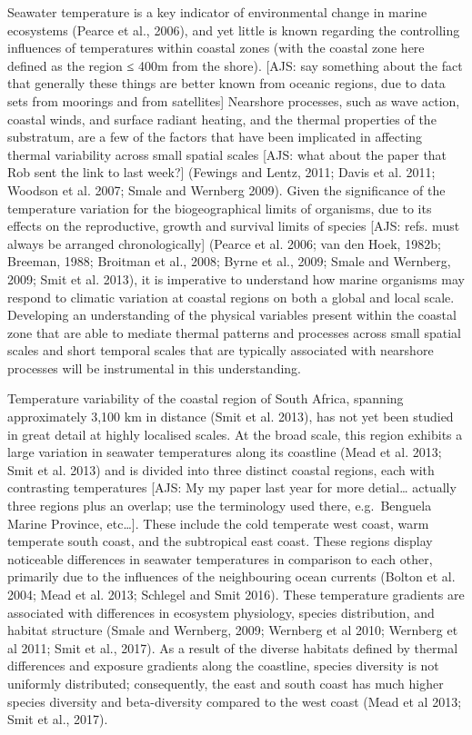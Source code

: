\documentclass[12pt,A4paper,]{article}
\begin{document}
Seawater temperature is a key indicator of environmental change in
marine ecosystems (Pearce et al., 2006), and yet little is known
regarding the controlling influences of temperatures within coastal
zones (with the coastal zone here defined as the region ≤ 400m from the
shore). {[}AJS: say something about the fact that generally these things
are better known from oceanic regions, due to data sets from moorings
and from satellites{]} Nearshore processes, such as wave action, coastal
winds, and surface radiant heating, and the thermal properties of the
substratum, are a few of the factors that have been implicated in
affecting thermal variability across small spatial scales {[}AJS: what
about the paper that Rob sent the link to last week?{]} (Fewings and
Lentz, 2011; Davis et al. 2011; Woodson et al. 2007; Smale and Wernberg
2009). Given the significance of the temperature variation for the
biogeographical limits of organisms, due to its effects on the
reproductive, growth and survival limits of species {[}AJS: refs. must
always be arranged chronologically{]} (Pearce et al. 2006; van den Hoek,
1982b; Breeman, 1988; Broitman et al., 2008; Byrne et al., 2009; Smale
and Wernberg, 2009; Smit et al. 2013), it is imperative to understand
how marine organisms may respond to climatic variation at coastal
regions on both a global and local scale. Developing an understanding of
the physical variables present within the coastal zone that are able to
mediate thermal patterns and processes across small spatial scales and
short temporal scales that are typically associated with nearshore
processes will be instrumental in this understanding.

Temperature variability of the coastal region of South Africa, spanning
approximately 3,100 km in distance (Smit et al. 2013), has not yet been
studied in great detail at highly localised scales. At the broad scale,
this region exhibits a large variation in seawater temperatures along
its coastline (Mead et al. 2013; Smit et al. 2013) and is divided into
three distinct coastal regions, each with contrasting temperatures
{[}AJS: My my paper last year for more detial\ldots{} actually three
regions plus an overlap; use the terminology used there, e.g.~Benguela
Marine Province, etc\ldots{}{]}. These include the cold temperate west
coast, warm temperate south coast, and the subtropical east coast. These
regions display noticeable differences in seawater temperatures in
comparison to each other, primarily due to the influences of the
neighbouring ocean currents (Bolton et al. 2004; Mead et al. 2013;
Schlegel and Smit 2016). These temperature gradients are associated with
differences in ecosystem physiology, species distribution, and habitat
structure (Smale and Wernberg, 2009; Wernberg et al 2010; Wernberg et al
2011; Smit et al., 2017). As a result of the diverse habitats defined by
thermal differences and exposure gradients along the coastline, species
diversity is not uniformly distributed; consequently, the east and south
coast has much higher species diversity and beta-diversity compared to
the west coast (Mead et al 2013; Smit et al., 2017).
\end{document}
